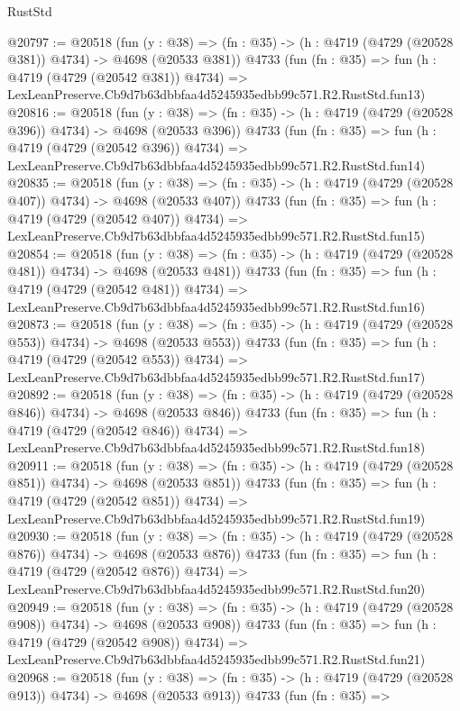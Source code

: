 \begin{lexlean}{RustStd}
\begin{coremodule}
@20797 := @20518
    (fun (y : @38) => (fn : @35) -> (h : @4719 (@4729 (@20528 @381)) @4734) -> @4698 (@20533 @381))
    @4733
    (fun (fn : @35) =>
    fun (h : @4719 (@4729 (@20542 @381)) @4734) =>
    LexLeanPreserve.Cb9d7b63dbbfaa4d5245935edbb99c571.R2.RustStd.fun13)
@20816 := @20518
    (fun (y : @38) => (fn : @35) -> (h : @4719 (@4729 (@20528 @396)) @4734) -> @4698 (@20533 @396))
    @4733
    (fun (fn : @35) =>
    fun (h : @4719 (@4729 (@20542 @396)) @4734) =>
    LexLeanPreserve.Cb9d7b63dbbfaa4d5245935edbb99c571.R2.RustStd.fun14)
@20835 := @20518
    (fun (y : @38) => (fn : @35) -> (h : @4719 (@4729 (@20528 @407)) @4734) -> @4698 (@20533 @407))
    @4733
    (fun (fn : @35) =>
    fun (h : @4719 (@4729 (@20542 @407)) @4734) =>
    LexLeanPreserve.Cb9d7b63dbbfaa4d5245935edbb99c571.R2.RustStd.fun15)
@20854 := @20518
    (fun (y : @38) => (fn : @35) -> (h : @4719 (@4729 (@20528 @481)) @4734) -> @4698 (@20533 @481))
    @4733
    (fun (fn : @35) =>
    fun (h : @4719 (@4729 (@20542 @481)) @4734) =>
    LexLeanPreserve.Cb9d7b63dbbfaa4d5245935edbb99c571.R2.RustStd.fun16)
@20873 := @20518
    (fun (y : @38) => (fn : @35) -> (h : @4719 (@4729 (@20528 @553)) @4734) -> @4698 (@20533 @553))
    @4733
    (fun (fn : @35) =>
    fun (h : @4719 (@4729 (@20542 @553)) @4734) =>
    LexLeanPreserve.Cb9d7b63dbbfaa4d5245935edbb99c571.R2.RustStd.fun17)
@20892 := @20518
    (fun (y : @38) => (fn : @35) -> (h : @4719 (@4729 (@20528 @846)) @4734) -> @4698 (@20533 @846))
    @4733
    (fun (fn : @35) =>
    fun (h : @4719 (@4729 (@20542 @846)) @4734) =>
    LexLeanPreserve.Cb9d7b63dbbfaa4d5245935edbb99c571.R2.RustStd.fun18)
@20911 := @20518
    (fun (y : @38) => (fn : @35) -> (h : @4719 (@4729 (@20528 @851)) @4734) -> @4698 (@20533 @851))
    @4733
    (fun (fn : @35) =>
    fun (h : @4719 (@4729 (@20542 @851)) @4734) =>
    LexLeanPreserve.Cb9d7b63dbbfaa4d5245935edbb99c571.R2.RustStd.fun19)
@20930 := @20518
    (fun (y : @38) => (fn : @35) -> (h : @4719 (@4729 (@20528 @876)) @4734) -> @4698 (@20533 @876))
    @4733
    (fun (fn : @35) =>
    fun (h : @4719 (@4729 (@20542 @876)) @4734) =>
    LexLeanPreserve.Cb9d7b63dbbfaa4d5245935edbb99c571.R2.RustStd.fun20)
@20949 := @20518
    (fun (y : @38) => (fn : @35) -> (h : @4719 (@4729 (@20528 @908)) @4734) -> @4698 (@20533 @908))
    @4733
    (fun (fn : @35) =>
    fun (h : @4719 (@4729 (@20542 @908)) @4734) =>
    LexLeanPreserve.Cb9d7b63dbbfaa4d5245935edbb99c571.R2.RustStd.fun21)
@20968 := @20518
    (fun (y : @38) => (fn : @35) -> (h : @4719 (@4729 (@20528 @913)) @4734) -> @4698 (@20533 @913))
    @4733
    (fun (fn : @35) =>

\end{coremodule}
\end{lexlean}
